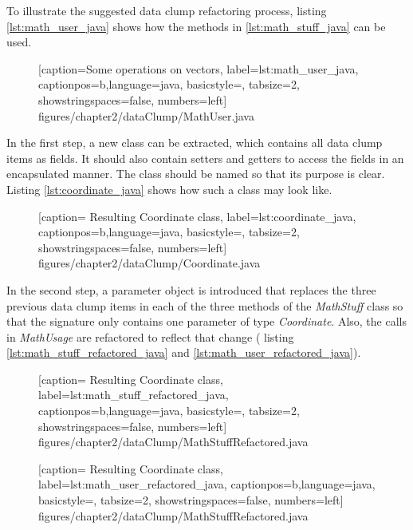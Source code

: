 To illustrate the suggested data clump refactoring process, listing \ref{lst:math_user_java} shows how the methods in \ref{lst:math_stuff_java} can be used. 


  \begin{figure} [htbp!]
			
			[caption={Some operations on vectors},
			label={lst:math_user_java},
			captionpos=b,language=java, basicstyle=\footnotesize, tabsize=2, showstringspaces=false,  numbers=left]
			{figures/chapter2/dataClump/MathUser.java}
	\end{figure}

In the first step, a new class can be extracted, which contains all data clump items as fields. It should also contain setters and getters to access the fields in an encapsulated manner. The class should be named so that its purpose is clear. Listing \ref{lst:coordinate_java} shows how such a class may look like. 

  \begin{figure} [htbp!]
			
			[caption={ Resulting Coordinate class},
			label={lst:coordinate_java},
			captionpos=b,language=java, basicstyle=\footnotesize, tabsize=2, showstringspaces=false,  numbers=left]
			{figures/chapter2/dataClump/Coordinate.java}
		\end{figure}

In the second step, a parameter object is introduced that replaces the three previous data clump items in each of the three methods of the \textit{MathStuff} class so that the signature only contains one parameter of type \textit{Coordinate}. Also, the calls in \textit{MathUsage} are refactored to reflect that change ( listing \ref{lst:math_stuff_refactored_java} and \ref{lst:math_user_refactored_java}). 

  \begin{figure} [htbp!]
			
			[caption={ Resulting Coordinate class},
			label={lst:math_stuff_refactored_java},
			captionpos=b,language=java, basicstyle=\footnotesize, tabsize=2, showstringspaces=false,  numbers=left]
			{figures/chapter2/dataClump/MathStuffRefactored.java}
		\end{figure}
  \begin{figure} [htbp!]
			
			[caption={ Resulting Coordinate class},
			label={lst:math_user_refactored_java},
			captionpos=b,language=java, basicstyle=\footnotesize, tabsize=2, showstringspaces=false,  numbers=left]
			{figures/chapter2/dataClump/MathStuffRefactored.java}
		\end{figure}

